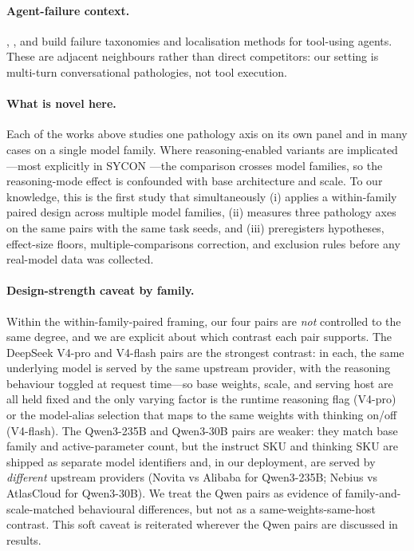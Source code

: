 \paragraph{Agent-failure context.}
\citet{wang2025agentfail}, \citet{yu2025trajectbench}, and
\citet{lin2025agentracer} build failure taxonomies and localisation
methods for tool-using agents. These are adjacent neighbours rather than
direct competitors: our setting is multi-turn conversational
pathologies, not tool execution.

\paragraph{What is novel here.}
Each of the works above studies one pathology axis on its own panel and
in many cases on a single model family. Where reasoning-enabled variants
are implicated---most explicitly in SYCON \citep{hong2025sycon}---the
comparison crosses model families, so the reasoning-mode effect is
confounded with base architecture and scale. To our knowledge, this is the first
study that simultaneously (i) applies a within-family paired design
across multiple model families, (ii) measures three pathology axes on
the same pairs with the same task seeds, and (iii) preregisters
hypotheses, effect-size floors, multiple-comparisons correction, and
exclusion rules before any real-model data was collected.

\paragraph{Design-strength caveat by family.}
Within the within-family-paired framing, our four pairs are \emph{not}
controlled to the same degree, and we are explicit about which contrast
each pair supports. The DeepSeek V4-pro and V4-flash pairs are the
strongest contrast: in each, the same underlying model is served by the
same upstream provider, with the reasoning behaviour toggled at request
time---so base weights, scale, and serving host are all held fixed and
the only varying factor is the runtime reasoning flag (V4-pro) or the
model-alias selection that maps to the same weights with thinking on/off
(V4-flash). The Qwen3-235B and Qwen3-30B pairs are weaker: they match
base family and active-parameter count, but the instruct SKU and
thinking SKU are shipped as separate model identifiers and, in our
deployment, are served by \emph{different} upstream providers (Novita
vs Alibaba for Qwen3-235B; Nebius vs AtlasCloud for Qwen3-30B). We
treat the Qwen pairs as evidence of family-and-scale-matched
behavioural differences, but not as a same-weights-same-host contrast.
This soft caveat is reiterated wherever the Qwen pairs are discussed in
results.
